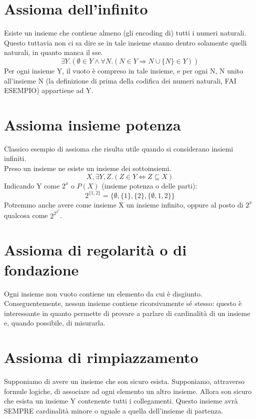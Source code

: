 \documentclass[12pt]{article}
\begin{document}
\section{Assioma dell'infinito}
Esiste un insieme che contiene almeno (gli encoding di) tutti i numeri naturali. Questo tuttavia non ci sa dire se in tale insieme stanno dentro solamente quelli naturali, in quanto manca il sse.
\[ \exists Y. (\emptyset \in Y \wedge \forall N. (N \in Y \Rightarrow N \cup \{ N \} \in Y)) \]
Per ogni insieme Y, il vuoto è compreso in tale insieme, e per ogni N, N unito all'insieme N (la definizione di prima della codifica dei numeri naturali, FAI ESEMPIO) appartiene ad Y.
\section{Assioma insieme potenza}
Classico esempio di assioma che risulta utile quando si considerano insiemi infiniti.\\
Preso un insieme ne esiste un insieme dei sottoinsiemi.
\[ X,\exists Y,Z.(Z \in Y \Leftrightarrow Z \subseteq X) \]
Indicando Y come $2^x$ o $P(X)$ (insieme potenza o delle parti):
\[ 2^{\{1,2\}} = \{\emptyset, \{ 1 \}, \{2\}, \{\emptyset, 1, 2\}\} \]
Potremmo anche avere come insieme X un insieme infinito, oppure al posto di $2^x$ qualcosa come $2^{2^{2^x}}$.
\section{Assioma di regolarità o di fondazione}
Ogni insieme non vuoto contiene un elemento da cui è disgiunto.\\
Conseguentemente, nessun insieme contiene ricorsivamente sé stesso: questo è interessante in quanto permette di provare a parlare di cardinalità di un insieme e, quando possibile, di misurarla.
\section{Assioma di rimpiazzamento}
Supponiamo di avere un insieme che son sicuro esista. Supponiamo, attraverso formule logiche, di associare ad ogni elemento un altro insieme.
Allora son sicuro che esista un insieme Y contenente tutti i collegamenti. Questo insieme avrà SEMPRE cardinalità minore o uguale a quella dell'insieme di partenza.
\end{document}
